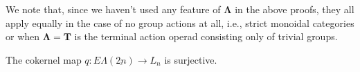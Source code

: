 \documentclass{amsbook} %
\newcommand{\mb}{\mathbf}
\newcommand{\ML}{\mathbf{\Lambda}}
\newcommand{\EL}{E\Lambda}
\numberwithin{section}{chapter}
\begin{document}
\begin{rem}\label{alsowithoutgroups}
We note that, since we haven't used any feature of $\ML$ in the above proofs, they all apply equally in the case of no group actions at all, i.e., strict monoidal categories or when $\ML = \mb{T}$ is the terminal action operad consisting only of trivial groups.
\end{rem}


\begin{cor}\label{qsurj} The cokernel map $q: \EL(\underline{2n}) \to L_n$ is surjective.
\end{cor}
\end{document}
